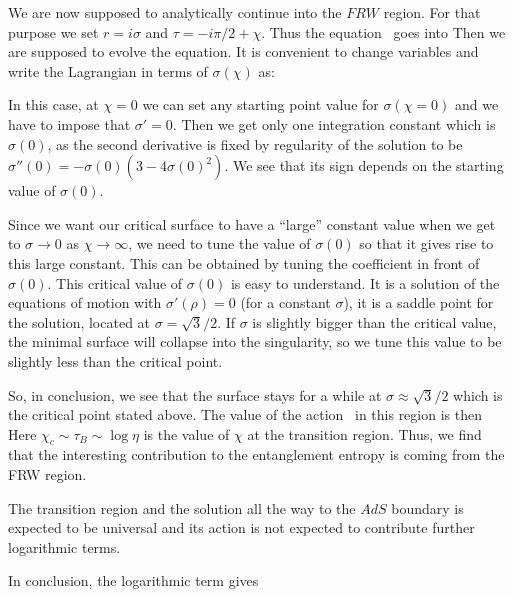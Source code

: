 We are now supposed to analytically continue into the $FRW$ region.
For that purpose we set
$r = i \sigma $ and $\tau = - i \pi/2 + \chi $.
Thus the equation \forta\ goes into
\eqn{}
Then we are supposed to evolve the equation. It is convenient to change variables and write the Lagrangian in terms of $\sigma(\chi)$ as:
 \eqn{}

 In this case,  at $\chi =0$ we can set any starting point value for $\sigma(\chi=0)$ and we have to
 impose that $\sigma'=0$. Then we get only one integration constant which is $\sigma( 0)$, as the second derivative
 is fixed by regularity of the solution to be $\sigma''(0) =- \sigma(0)( 3 -  4 \sigma(0)^2 ) $. We see that its sign depends on the starting value of $\sigma(0)$.

Since we want our critical surface to have a ``large'' constant value
 when we get to $\sigma\to 0$ as $\chi \to \infty$, we  need to tune the value of $\sigma(0)$ so that it gives
 rise to this large constant. This can be obtained by
  tuning the coefficient in front of $\sigma(0)$. This critical value of $\sigma(0)$ is easy to understand.
  It is a solution of the equations of motion with $\sigma'(\rho ) =0$ (for a constant $\sigma$), it is  a saddle
  point for the solution, located at $\sigma = \sqrt{3}/2$. If $\sigma$ is slightly bigger than the critical value, the minimal surface will collapse into the singularity, so we tune this value to be slightly less than the critical point.

 So, in conclusion, we see that the surface stays for a while at $\sigma \approx \sqrt{3}/2$ which is the critical point stated above.
 The value of the action \lagoth\ in this region is then 
 \eqn{}
 Here $\chi_c \sim \tau_B \sim \log \eta$ is the value of $\chi$ at the transition region.
 Thus, we find that the interesting contribution to the entanglement entropy is coming from the FRW region.

The transition region and the solution all the way to the $AdS$ boundary is expected to be universal and
its action is not  expected to contribute further logarithmic terms.

In conclusion, the logarithmic term gives
\eqn{}

